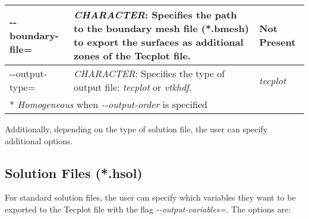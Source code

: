 \documentclass[a4paper,10pt]{report}
\begin{document}
\begin{longtable}{|p{4cm}|p{10cm}|p{2.2cm}|}
-{}-boundary-file= 	&
			\textit{CHARACTER}: Specifies the path to the boundary mesh file (*.bmesh) to export the surfaces as additional zones of the Tecplot file. &
							Not Present  \\ \hline

-{}-output-type= 	&
            \textit{CHARACTER}: Specifies the type of output file: \textit{tecplot} or \textit{vtkhdf}. &
                            \textit{tecplot}  \\ \hline
\multicolumn{3}{p{16.4cm}}{*  \textit{Homogeneous} when \textit{-{}-output-order} is specified} \\

\end{longtable}

Additionally, depending on the type of solution file, the user can specify additional options.

\subsection{Solution Files (*.hsol)} \label{PostProc:hsol}

For standard solution files, the user can specify which variables they want to be exported to the Tecplot file with the flag \textit{-{}-output-variables=}.
The options are:
\end{document}
